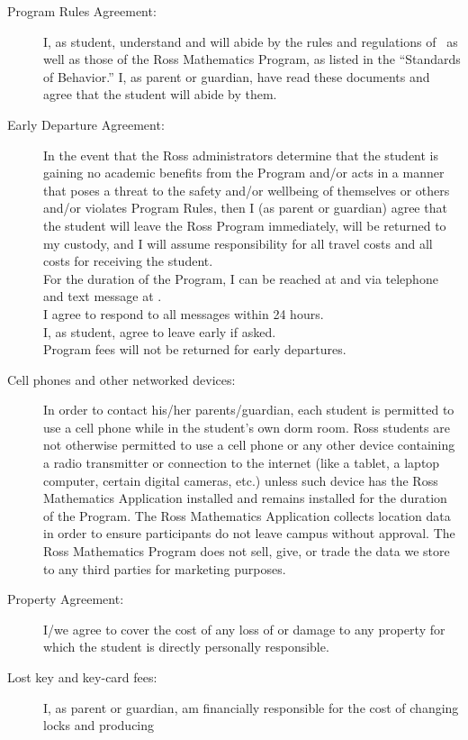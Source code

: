 \documentclass{ross}
\begin{document}
\begin{description}
\item[Program Rules Agreement:] I, as student, understand and will
  abide by the rules and regulations of \campus\ as
  well as those of the Ross Mathematics Program, as listed in the
  ``Standards of Behavior.'' I, as parent or guardian, have read
  these documents and agree that the student will abide by them.
\item[Early Departure Agreement:] In the event that the Ross
  administrators determine that the student is gaining no academic
  benefits from the Program and/or acts in a manner that poses a
  threat to the safety and/or wellbeing of themselves or others and/or
  violates Program Rules, then I (as parent or guardian) agree that
  the student will leave the Ross Program immediately, will be
  returned to my custody, and I will assume responsibility for all
  travel costs and all costs for receiving the student. \\
   For the
  duration of the Program, I can be reached at
   and via telephone and text message at
  . \\[5pt]
   I agree to respond to all messages within 24 hours. \\[1ex]
  I, as student, agree to leave early if asked.  \\
Program fees will not
  be returned for early departures.
\item[Cell phones and other networked devices:] In order to contact
  his/her parents/guardian, each student is permitted to use a cell
  phone while in the student's own dorm room. Ross students are not
  otherwise permitted to use a cell phone or any other device
  containing a radio transmitter or connection to the internet (like a
  tablet, a laptop computer, certain digital cameras, etc.) unless
  such device has the Ross Mathematics Application installed and
  remains installed for the duration of the Program.  The Ross
  Mathematics Application collects location data in order to ensure
  participants do not leave campus without approval.  The Ross
  Mathematics Program does not sell, give, or trade the data we store
  to any third parties for marketing purposes.
\item[Property Agreement:] I/we agree to cover the cost of any loss of
  or damage to any property for which the student is directly
  personally responsible.
\item[Lost key and key-card fees:] I, as parent or guardian, am
  financially responsible for the cost of changing locks and producing

\end{description}
\end{document}
